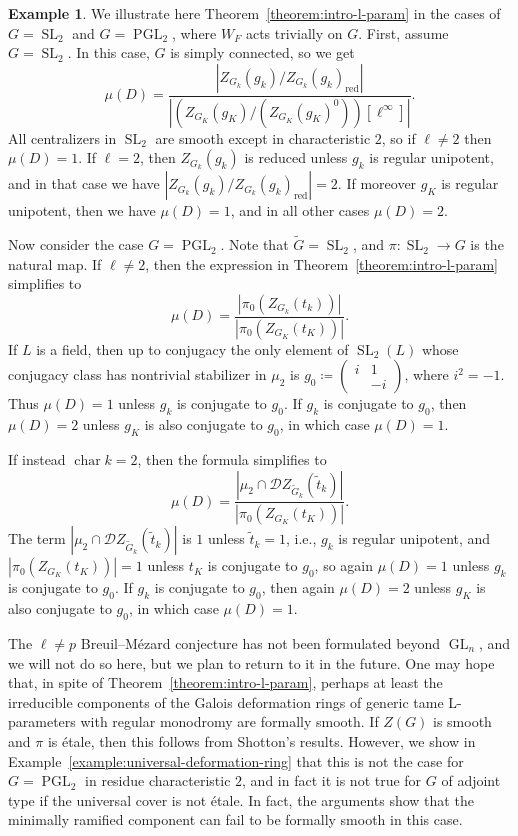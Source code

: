 \documentclass[11pt,reqno]{amsart}
\theoremstyle{definition}
\newtheorem{example}[theorem]{Example}
\renewcommand{\rm}{\mathrm}
\newcommand{\sD}{{\mathscr D}}
\DeclareMathOperator{\chara}{char}
\DeclareMathOperator{\GL}{GL}
\DeclareMathOperator{\PGL}{PGL}
\DeclareMathOperator{\SL}{SL}
\begin{document}
\begin{example}\label{example:multiplicity-theorem-illustrated}
	We illustrate here Theorem~\ref{theorem:intro-l-param} in the cases of $G = \SL_2$ and $G = \PGL_2$, where $W_F$ acts trivially on $G$. First, assume $G = \SL_2$. In this case, $G$ is simply connected, so we get
	\[
	\mu(D) = \frac{|Z_{G_k}(g_k)/Z_{G_k}(g_k)_{\rm{red}}|}{|(Z_{G_K}(g_K)/(Z_{G_K}(g_K)^0))[\ell^\infty]|}.
	\]
	All centralizers in $\SL_2$ are smooth except in characteristic $2$, so if $\ell \neq 2$ then $\mu(D) = 1$. If $\ell = 2$, then $Z_{G_k}(g_k)$ is reduced unless $g_k$ is regular unipotent, and in that case we have $|Z_{G_k}(g_k)/Z_{G_k}(g_k)_{\rm{red}}| = 2$. If moreover $g_K$ is regular unipotent, then we have $\mu(D) = 1$, and in all other cases $\mu(D) = 2$.

    Now consider the case $G = \PGL_2$. Note that $\widetilde{G} = \SL_2$, and $\pi\colon \SL_2 \to G$ is the natural map. If $\ell \neq 2$, then the expression in Theorem~\ref{theorem:intro-l-param} simplifies to 
    \[
        \mu(D) = \frac{|\pi_0(Z_{G_k}(t_k))|}{|\pi_0(Z_{G_K}(t_K))|}.
    \]
    If $L$ is a field, then up to conjugacy the only element of $\SL_2(L)$ whose conjugacy class has nontrivial stabilizer in $\mu_2$ is $g_0 \coloneqq\begin{pmatrix} i &1 \\ &-i \end{pmatrix}$, where $i^2 = -1$. Thus $\mu(D) = 1$ unless $g_k$ is conjugate to $g_0$. If $g_k$ is conjugate to $g_0$, then $\mu(D) = 2$ unless $g_K$ is also conjugate to $g_0$, in which case $\mu(D) = 1$.
    
    If instead $\chara k = 2$, then the formula simplifies to
    \[
    \mu(D) = \frac{|\mu_2 \cap \sD Z_{\widetilde{G}_k}(\widetilde{t}_k)|}{|\pi_0(Z_{G_K}(t_K))|}.
    \]
    The term $|\mu_2 \cap \sD Z_{\widetilde{G}_k}(\widetilde{t}_k)|$ is $1$ unless $\widetilde{t}_k = 1$, i.e., $g_k$ is regular unipotent, and $|\pi_0(Z_{G_K}(t_K))| = 1$ unless $t_K$ is conjugate to $g_0$, so again $\mu(D) = 1$ unless $g_k$ is conjugate to $g_0$. If $g_k$ is conjugate to $g_0$, then again $\mu(D) = 2$ unless $g_K$ is also conjugate to $g_0$, in which case $\mu(D) = 1$.
\end{example}

The $\ell \neq p$ Breuil--M\'ezard conjecture has not been formulated beyond $\GL_n$, and we will not do so here, but we plan to return to it in the future. One may hope that, in spite of Theorem~\ref{theorem:intro-l-param}, perhaps at least the irreducible components of the Galois deformation rings of generic tame L-parameters with regular monodromy are formally smooth. If $Z(G)$ is smooth and $\pi$ is \'etale, then this follows from Shotton's results. However, we show in Example~\ref{example:universal-deformation-ring} that this is not the case for $G = \PGL_2$ in residue characteristic $2$, and in fact it is not true for $G$ of adjoint type if the universal cover is not \'etale. In fact, the arguments show that the minimally ramified component can fail to be formally smooth in this case.
\end{document}
